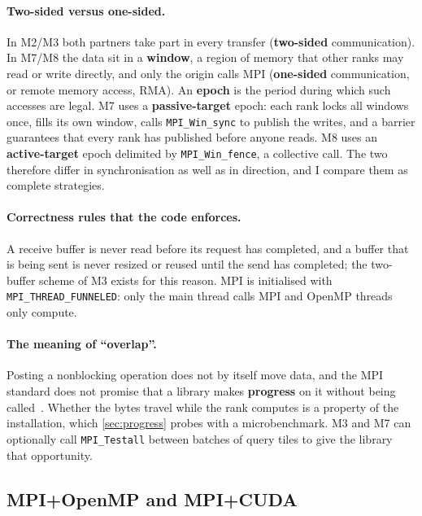 \documentclass[10pt,a4paper]{article}
\newcommand{\term}[1]{\textbf{#1}}
\newcommand{\code}[1]{\texttt{#1}}
\begin{document}
\paragraph{Two-sided versus one-sided.} In M2/M3 both partners take part in every
transfer (\term{two-sided} communication). In M7/M8 the data sit in a \term{window},
a region of memory that other ranks may read or write directly, and only the origin
calls MPI (\term{one-sided} communication, or remote memory access, RMA). An
\term{epoch} is the period during which such accesses are legal. M7 uses a
\term{passive-target} epoch: each rank locks all windows once, fills its own window,
calls \code{MPI\_Win\_sync} to publish the writes, and a barrier guarantees that
every rank has published before anyone reads. M8 uses an \term{active-target} epoch
delimited by \code{MPI\_Win\_fence}, a collective call. The two therefore differ in
synchronisation as well as in direction, and I compare them as complete strategies.

\paragraph{Correctness rules that the code enforces.} A receive buffer is never read
before its request has completed, and a buffer that is being sent is never resized
or reused until the send has completed; the two-buffer scheme of M3 exists for this
reason. MPI is initialised with \code{MPI\_THREAD\_FUNNELED}: only the main thread
calls MPI and OpenMP threads only compute.

\paragraph{The meaning of ``overlap''.} Posting a nonblocking operation does not by
itself move data, and the MPI standard does not promise that a library makes
\term{progress} on it without being called~\cite{mpi}. Whether the bytes travel while
the rank computes is a property of the installation, which \cref{sec:progress}
probes with a microbenchmark. M3 and M7 can optionally call \code{MPI\_Testall} between batches of
query tiles to give the library that opportunity.

\subsection{MPI+OpenMP and MPI+CUDA}\label{sec:xdesign}
\end{document}
